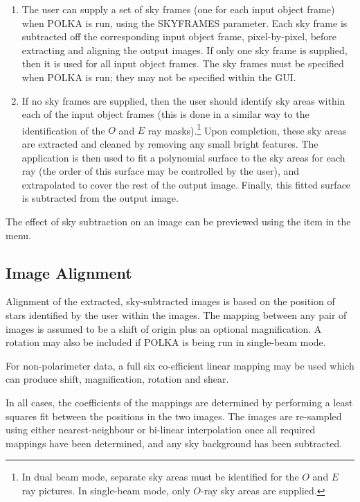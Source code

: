 \begin{enumerate}

\item The user can supply a set of sky frames (one for each input object
frame) when POLKA is run, using the SKYFRAMES parameter. Each sky
frame is subtracted off the corresponding input object frame,
pixel-by-pixel, before extracting and aligning the output images. If only
one sky frame is supplied, then it is used for all input object frames.
The sky frames must be specified when POLKA is run; they may not be
specified within the GUI.

\item If no sky frames are supplied, then the user should identify sky areas
within each of the input object frames (this is done in a similar way to
the identification of the $O$ and $E$ ray masks).\footnote{In dual beam
mode, separate sky areas must be identified for the $O$ and $E$ ray
pictures. In single-beam mode, only $O$-ray sky areas are supplied.}
Upon completion, these sky areas are extracted and cleaned by removing
any small bright features. The  application 
 is then used to fit a polynomial surface 
to the sky areas for each ray (the order of this surface may be controlled 
by the user), and extrapolated to cover the rest of the output image. 
Finally, this fitted surface is subtracted from the output image.

\end{enumerate}

The effect of sky subtraction on an image can be previewed using the
 item in the 
 menu.

\subsection{Image Alignment}
Alignment of the extracted, sky-subtracted images is based on the
position of stars identified by the user within the images. The mapping
between any pair of images is assumed to be a shift of origin plus an
optional magnification. A rotation may also be included if POLKA is being
run in single-beam mode. 

For non-polarimeter data, a full six co-efficient linear mapping may be
used which can produce shift, magnification, rotation and shear.

In all cases, the coefficients of the mappings are determined by
performing a least squares fit between the positions in the two images.
The images are re-sampled using either nearest-neighbour or bi-linear
interpolation once all required mappings have been determined, and any
sky background has been subtracted.

